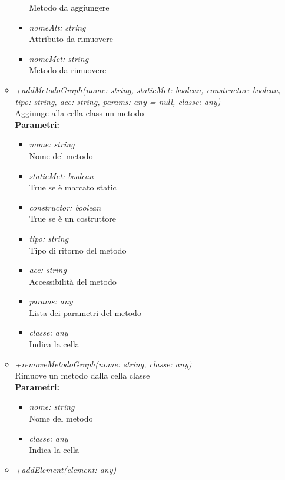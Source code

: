 \begin{itemize}
\begin{itemize}
\begin{itemize}
    			Metodo da aggiungere
    			\item \emph{nomeAtt: string}\\
    			Attributo da rimuovere
    			\item \emph{nomeMet: string}\\
    			Metodo da rimuovere
    		\end{itemize}
    		\item \emph{+addMetodoGraph(nome: string, staticMet: boolean, constructor: boolean,
    tipo: string, acc: string, params: any = null, classe: any)}\\
    		Aggiunge alla cella class un metodo\\
    		\textbf{Parametri:}
    		\begin{itemize}
    			\item \emph{nome: string}\\
    			Nome del metodo
    			\item \emph{staticMet: boolean}\\
    			True se è marcato static
    			\item \emph{constructor: boolean}\\
    			True se è un costruttore
    			\item \emph{tipo: string}\\
    			Tipo di ritorno del metodo
    			\item \emph{acc: string}\\
    			Accessibilità del metodo
    			\item \emph{params: any}\\
    			Lista dei parametri del metodo
    			\item \emph{classe: any}\\
    			Indica la cella
    		\end{itemize}
    		\item \emph{+removeMetodoGraph(nome: string, classe: any)}\\
    		Rimuove un metodo dalla cella classe\\
    		\textbf{Parametri:}
    		\begin{itemize}
    			\item \emph{nome: string}\\
    			Nome del metodo
    			\item \emph{classe: any}\\
    			Indica la cella
    		\end{itemize}
    		\item \emph{+addElement(element: any)}\\

\end{itemize}
\end{itemize}
